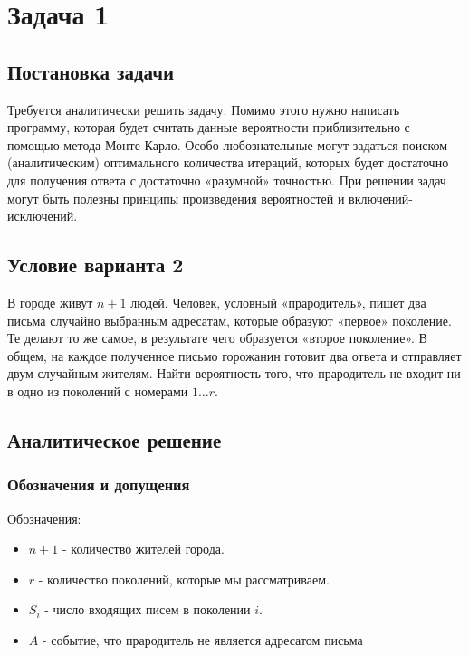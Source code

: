 \documentclass[a4paper,14pt]{extarticle}
\begin{document}
    
    \section*{Задача 1}
        
        \subsection*{Постановка задачи}
            
            Требуется аналитически решить задачу. Помимо этого нужно написать программу, которая будет считать данные вероятности приблизительно с помощью метода Монте-Карло. Особо любознательные могут задаться поиском (аналитическим) оптимального количества итераций, которых будет достаточно для получения ответа с достаточно «разумной» точностью. При решении задач могут быть полезны принципы произведения вероятностей и включений-исключений.
        
        \subsection*{Условие варианта 2}
            
            В городе живут \( n + 1 \) людей. Человек, условный «прародитель», пишет два письма случайно выбранным адресатам, которые образуют «первое» поколение. Те делают то же самое, в результате чего образуется «второе поколение». В общем, на каждое полученное письмо горожанин готовит два ответа и отправляет двум случайным жителям. Найти вероятность того, что прародитель не входит ни в одно из поколений с номерами \( 1 \ldots r \).
        
        \subsection*{Аналитическое решение}
            
            \subsubsection*{Обозначения и допущения}
                
                Обозначения:
                \begin{itemize}
                    \item \( n + 1 \) - количество жителей города.
                    \item \( r \) - количество поколений, которые мы рассматриваем.
                    \item \( S_i \) - число входящих писем в поколении \( i \).
                    \item \( A \) - событие, что прародитель не является адресатом письма
                \end{itemize}
                
\end{document}
